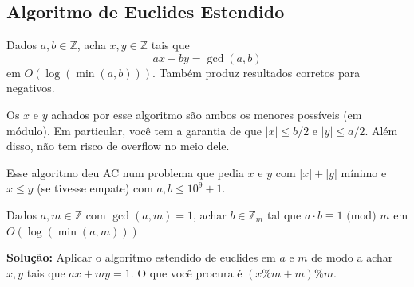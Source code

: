 \subsection{Algoritmo de Euclides Estendido}

Dados $a, b \in \mathbb{Z}$, acha $x, y \in \mathbb{Z}$ tais que
$$ ax + by = \gcd(a, b)$$
em $O(\log(\min(a, b)))$. Também produz resultados corretos para negativos.

Os $x$ e $y$ achados por esse algoritmo são ambos os menores possíveis (em módulo). Em particular, você tem a garantia de que $|x| \leq b/2$ e $|y| \leq a/2$. Além disso, não tem risco de overflow no meio dele. 

Esse algoritmo deu AC num problema que pedia $x$ e $y$ com $|x| + |y|$ mínimo e $x \leq y$ (se tivesse empate) com $a, b \leq 10^9 + 1$.


 Dados $a, m \in \mathbb{Z}$ com $\gcd(a, m) = 1$, achar $b \in \mathbb{Z}_m$ tal que $a \cdot b \equiv 1 \text{ (mod) } m$ em $O(\log(\min(a, m)))$

\textbf{Solução:} Aplicar o algoritmo estendido de euclides em $a$ e $m$ de modo a achar $x, y$ tais que $ax + my = 1$. O que você procura é $(x \% m + m) \% m$.

